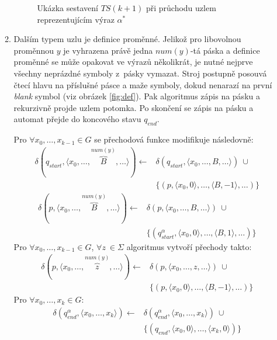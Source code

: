 \documentclass[thesis=B,czech]{FITthesis}[2019/12/23]
\theoremstyle{definition}
\begin{document}
\begin{enumerate}
\begin{enumerate}
\begin{figure}[ht]
\begin{tikzpicture}[scale=0.8]
	\end{tikzpicture}
	\caption{Ukázka sestavení $TS(k+1)$ při průchodu uzlem reprezentujícím výraz $\alpha^\ast$}
	\label{fig:iter}
\end{figure}

	 \item \label{itm:def}{Dalším typem uzlu je definice proměnné. Jelikož pro libovolnou proměnnou $y$ je vyhrazena právě jedna $num(y)$-tá páska a definice proměnné se může opakovat ve výrazů několikrát, je nutné nejprve všechny neprázdné symboly z~pásky vymazat. Stroj postupně posouvá čtecí hlavu na příslušné pásce a maže symboly, dokud nenarazí na první \emph{blank} symbol (viz obrázek \ref{fig:def}). Pak algoritmus  zápis na pásku a rekurzivně projde uzlem potomka. Po skončení se  zápis na pásku a automat přejde do koncového stavu $q_{end}$. 

	Pro  $\forall x_0, \dots, x_{k-1} \in G$ se přechodová funkce modifikuje následovně:
		\begin{equation*}\begin{split}
		\delta(q_{start}, \langle  x_0, \dots, \overbrace{B}^{num(y)}, \dots \rangle)\leftarrow&\delta(q_{start}, \langle  x_0, \dots, B, \dots \rangle) \ \cup\\&\{(p, \langle x_0, 0\rangle, \dots, \langle B, -1\rangle, \dots)\}\end{split}\end{equation*}
		\begin{equation*}\begin{split}
		\delta(p, \langle  x_0, \dots, \overbrace{B}^{num(y)}, \dots \rangle)\leftarrow&\delta(p, \langle  x_0, \dots, B, \dots \rangle) \ \cup\\&\{(q_{start}^{\alpha}, \langle x_0, 0\rangle, \dots, \langle B, 1\rangle, \dots)\}\end{split}\end{equation*}
	Pro $\forall x_0, \dots, x_{k-1} \in G$,  $\forall z~\in \Sigma$ algoritmus vytvoří přechody takto:
\begin{equation*}\begin{split}\delta(p, \langle  x_0, \dots, \overbrace{z}^{num(y)}, \dots \rangle)\leftarrow&\delta(p, \langle  x_0, \dots, z, \dots \rangle) \ \cup\\&\{(p, \langle x_0, 0\rangle, \dots, \langle B, -1\rangle, \dots)\}\end{split}\end{equation*}
		Pro $\forall x_0, \dots, x_{k} \in G$:
		\begin{equation*}\begin{split}\delta(q_{end}^{\alpha}, \langle  x_0, \dots, x_{k}\rangle)\leftarrow&\delta(q_{end}^{\alpha}, \langle  x_0, \dots, x_k\rangle) \ \cup \\ &\{(q_{end}, \langle x_0, 0\rangle, \dots, \langle x_k, 0\rangle)\} \end{split}\end{equation*}
	}
	

\end{enumerate}
\end{enumerate}
\end{document}
